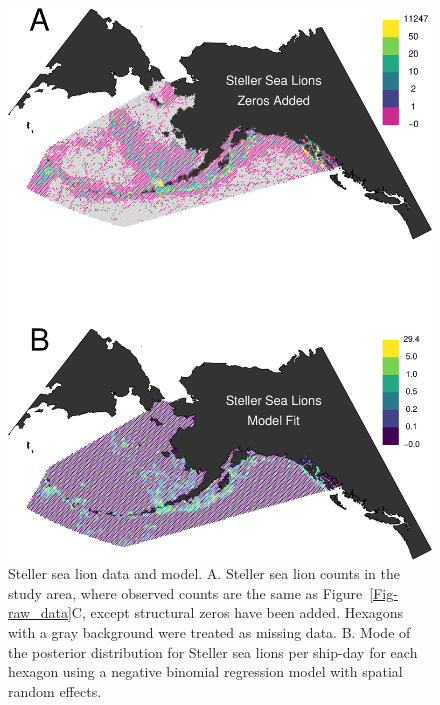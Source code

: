 \documentclass[11pt, titlepage]{article}
\begin{document}
\begin{spacing}{1.9}
\begin{flushleft}
\begin{figure}[H]
  \begin{center}
  \includegraphics[width=.75\linewidth]{figures/Fig-SeaLionFit}
  \end{center}
  \caption{Steller sea lion data and model. A. Steller sea lion counts in the study area, where observed counts are the same as Figure~\ref{Fig-raw_data}C, except structural zeros have been added. Hexagons with a gray background were treated as missing data. B. Mode of the posterior distribution for Steller sea lions per ship-day for each hexagon using a negative binomial regression model with spatial random effects.  \label{Fig-SeaLionFit}}         
\end{figure} 


\end{flushleft}
\end{spacing}
\end{document}
